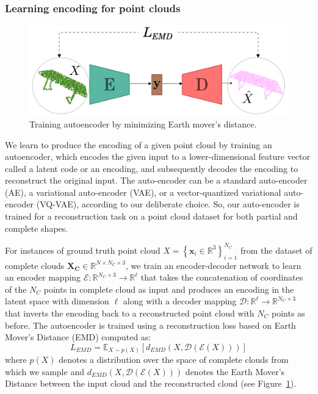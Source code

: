         \subsubsection{Learning encoding for point clouds}
        \begin{figure}[htb]
          \begin{center}
          \includegraphics[width=\linewidth]{figures/emd_ae.png}
          \end{center}
          \caption{Training autoencoder by minimizing Earth mover's distance.}\label{fig:emd_ae}
        \end{figure}
        We learn to produce the encoding of a given point cloud by training an autoencoder, which encodes the given input to a lower-dimensional feature vector called a latent code or an encoding, and subsequently decodes the encoding to reconstruct the original input. The auto-encoder can be a standard auto-encoder (AE), a variational auto-encoder (VAE), or a vector-quantized variational auto-encoder (VQ-VAE), according to our deliberate choice. So, our auto-encoder is trained for a reconstruction task on a point cloud dataset for both partial and complete shapes.

        For instances of ground truth point cloud $X=\left\{\mathbf{x}_{i} \in \mathbb{R}^{3}\right\}_{i=1}^{N_C}$ from the dataset of complete clouds $\mathbf{X_C} \in \mathbb{R}^{N \times N_C \times 3}$, we train an encoder-decoder network to learn an encoder mapping $\mathcal{E}: \mathbb{R}^{N_C \times 3} \rightarrow \mathbb{R}^{\ell}$ that takes the concatenation of coordinates of the $N_C$ points in complete cloud as input and produces an encoding in the latent space with dimension $\ell$ along with a decoder mapping $\mathcal{D}: \mathbb{R}^{\ell} \rightarrow \mathbb{R}^{N_C \times 3}$ that inverts the encoding back to a reconstructed point cloud with $N_C$ points as before. The autoencoder is trained using a reconstruction loss based on Earth Mover's Distance (EMD) computed as:
        \begin{equation}\label{emd_loss}
            L_{EMD} = \mathbb{E}_{X \sim p(X)} \left[d_{EMD}\left(X, \mathcal{D}(\mathcal{E}(X))\right)\right]
        \end{equation}
        where $p(X)$ denotes a distribution over the space of complete clouds from which we sample and $d_{EMD}\left(X, \mathcal{D}(\mathcal{E}(X))\right)$ denotes the Earth Mover's Distance between the input cloud and the reconstructed cloud (see Figure~\ref{fig:emd_ae}).

